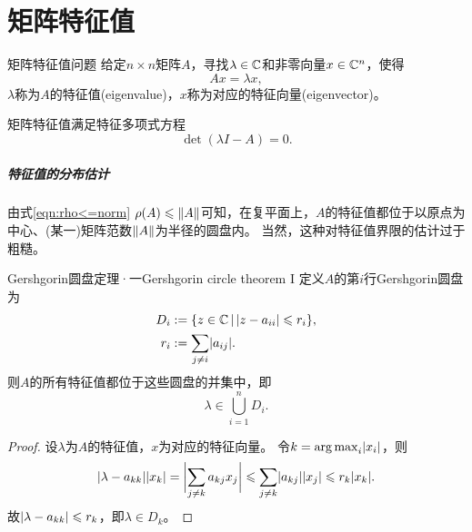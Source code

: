 \chapter{矩阵特征值}
\label{chap:eigenvalue}

\begin{definition}
    {矩阵特征值问题}{}
    给定$n \times n$矩阵$A$，寻找$\lambda \in \mathbb{C}$和非零向量$x \in \mathbb{C}^n$，使得
    \begin{equation}
        Ax = \lambda x,
    \end{equation}
    $\lambda$称为$A$的特征值(eigenvalue)，$x$称为对应的特征向量(eigenvector)。
\end{definition}

\begin{corollary}
    矩阵特征值满足特征多项式方程
    \begin{equation}
        \det(\lambda I - A) = 0.
    \end{equation}
\end{corollary}

\paragraph{特征值的分布估计}

由式\eqref{eqn:rho<=norm} $\rho(A) \leqslant \lVert A\rVert$可知，在复平面上，$A$的特征值都位于以原点为中心、(某一)矩阵范数$\lVert A\rVert$为半径的圆盘内。
当然，这种对特征值界限的估计过于粗糙。

\begin{theorem}
    {Gershgorin圆盘定理·一}{Gershgorin circle theorem I}
    定义$A$的第$i$行Gershgorin圆盘为
    \begin{subequations}
        \begin{align}
            D_i &:= \{z \in \mathbb{C}\,\vert\,\lvert z - a_{ii}\rvert \leqslant r_i\},\\
            r_i &:= \sum_{j\neq i}\lvert a_{ij}\rvert.
        \end{align}
    \end{subequations}
    则$A$的所有特征值都位于这些圆盘的并集中，即
    \begin{equation}
        \lambda \in \bigcup_{i=1}^nD_i.
    \end{equation}
\end{theorem}

\begin{proof}
    设$\lambda$为$A$的特征值，$x$为对应的特征向量。
    令$\textstyle k = \operatorname*{arg\,max}_i\lvert x_i\rvert$，则
    \[
        \lvert\lambda - a_{kk}\rvert\lvert x_k\rvert = \biggl\lvert\sum_{j\neq k}a_{kj}x_j\biggr\rvert \leqslant \sum_{j\neq k}\lvert a_{kj}\rvert\lvert x_j\rvert \leqslant r_k\lvert x_k\rvert.
    \]
    故$\lvert\lambda - a_{kk}\rvert \leqslant r_k$，即$\lambda \in D_k$。
\end{proof}

